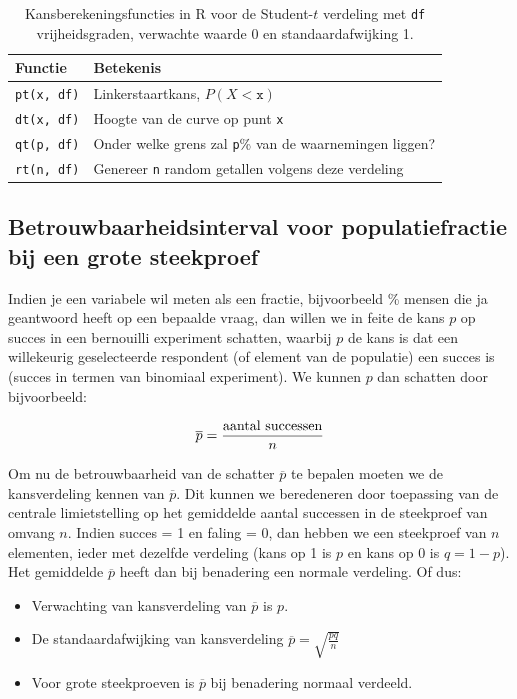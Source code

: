 {\begin{table}
  \centering
  \begin{tabular}{ll}
  	\textbf{Functie} & \textbf{Betekenis}                                             \\ \midrule
  	\verb|pt(x, df)| & Linkerstaartkans, $P(X<\mathtt{x})$                            \\
  	\verb|dt(x, df)| & Hoogte van de curve op punt \texttt{x}                         \\
  	\verb|qt(p, df)| & Onder welke grens zal \texttt{p}\% van de waarnemingen liggen? \\
  	\verb|rt(n, df)| & Genereer \texttt{n} random getallen volgens deze verdeling
  \end{tabular}

  \caption{Kansberekeningsfuncties in R voor de Student-$t$ verdeling met \texttt{df} vrijheidsgraden, verwachte waarde 0 en standaardafwijking 1.}
  \label{tab:t-prob-r}
\end{table}

\subsection{Betrouwbaarheidsinterval voor populatiefractie bij een grote steekproef}
\label{ssec:betrouwbaarheidsinterval-populatiefractie}

Indien je een variabele wil meten als een fractie, bijvoorbeeld \% mensen die ja geantwoord heeft op een bepaalde vraag, dan willen we in feite de kans $p$ op succes in een bernouilli experiment schatten, waarbij $p$ de kans is dat een willekeurig geselecteerde respondent (of element van de populatie) een succes is (succes in termen van binomiaal experiment). We kunnen $p$ dan schatten door bijvoorbeeld:

\[ \overline{p} = \frac{\textnormal{aantal successen}}{n} \]

Om nu de betrouwbaarheid van de schatter $\overline{p}$ te bepalen moeten we de kansverdeling kennen van $\overline{p}$. Dit kunnen we beredeneren door toepassing van de centrale limietstelling op het gemiddelde aantal successen in de steekproef van omvang $n$. Indien succes = 1 en faling = 0, dan hebben we een steekproef van $n$ elementen, ieder met dezelfde verdeling (kans op 1 is $p$ en kans op 0 is $q=1-p$).  Het gemiddelde $\overline{p}$ heeft dan bij benadering een normale verdeling. Of dus:

\begin{itemize}
  \item Verwachting van kansverdeling van $\overline{p}$ is $p$.
  \item De standaardafwijking van kansverdeling $\overline{p} = \sqrt{\frac{pq}{n}}$
  \item Voor grote steekproeven is $\overline{p}$ bij benadering normaal verdeeld.
\end{itemize}

}
